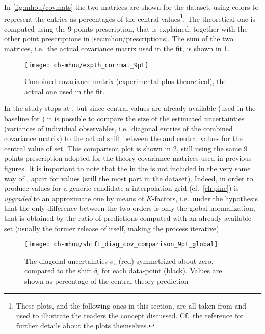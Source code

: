 In \cref{fig:mhou/covmats} the two matrices are shown for the 
dataset, using colors to represent the entries as percentages of the central
values\footnote{
  These plots, and the following ones in this section, are all taken from
  \cite{NNPDF:2019ubu} and used to illustrate the readers the concept
  discussed.
  Cf.\ the reference for further details about the plots themselves.
}.
The theoretical one is computed using the 9 points prescription, that is
explained, together with the other point prescriptions in
\cref{sec:mhou/prescriptions}.
%
The sum of the two matrices, i.e.\ the actual covariance matrix used in the
 fit, is shown in \cref{fig:mhou/combined-covmat}.

\begin{figure}
	\centering
	\texttt{[image: ch-mhou/expth\_corrmat\_9pt]}
	\caption{
		Combined covariance matrix (experimental plus theoretical), the actual
		one used in the  fit.
	}
	\label{fig:mhou/combined-covmat}
\end{figure}

In \cite{NNPDF:2019ubu} the \mhou study stops at \nlo, but since \nnlo central
values are already available (used in the baseline for ) it is possible 
to compare the size of the estimated uncertainties (variances of individual
observables, i.e.\ diagonal entries of the combined covariance matrix) to the
actual shift between the \nlo and \nnlo central values for the central value of
 \pdf set.
%
This comparison plot is shown in \cref{fig:mhou/scvar-shifts}, still using the
same 9 points prescription adopted for the theory covariance matrices used in
previous figures.
%
It is important to note that the \nnlo in the \pdf is not included in the very
same way of \nlo, apart for \dis values (still the most part in the
 dataset).
Indeed, in order to produce \nnlo values for a generic \pdf candidate a \nlo
interpolation grid (cf.\ \cref{ch:pine}) is \textit{upgraded} to an approximate
\nnlo one by means of $K$-factors, i.e.\ under the hypothesis that the only
difference between the two orders is only the global normalization, that is
obtained by the ratio of predictions computed with an already available \pdf
set (usually the former release of \nnpdf itself, making the process
iterative).

\begin{figure}
	\centering
	\texttt{[image: ch-mhou/shift\_diag\_cov\_comparison\_9pt\_global]}
	\caption{
		The diagonal uncertainties $\sigma_i$ (red) symmetrized about zero,
		compared to the shift $\delta_i$ for each data-point (black).
		Values are shown as percentage of the central theory prediction
	}
	\label{fig:mhou/scvar-shifts}
\end{figure}

